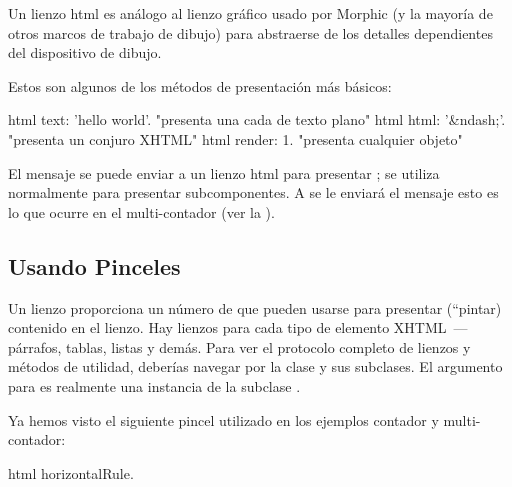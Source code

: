 \documentclass[a4paper,10pt,twoside]{book}
\begin{document}
Un lienzo html es análogo al lienzo gráfico usado por Morphic (y la mayoría de otros marcos de trabajo de dibujo) para abstraerse de los detalles dependientes del dispositivo de dibujo.
 
Estos son algunos de los métodos de presentación más básicos:
\begin{code}{}
html text: 'hello world'.  "presenta una cada de texto plano"
html html: '&ndash;'.     "presenta un conjuro XHTML"
html render: 1.              "presenta cualquier objeto"
\end{code}

El mensaje  se puede enviar a un lienzo html para presentar ; se utiliza normalmente para presentar subcomponentes. A  se le enviará el mensaje 
esto es lo que ocurre en el multi-contador (ver la ).

\subsection{Usando Pinceles}

Un lienzo proporciona un número de  que pueden usarse para presentar (\ie ``pintar) contenido en el lienzo.
Hay lienzos para cada tipo de elemento XHTML \,---\,párrafos, tablas, listas y demás.
Para ver el protocolo completo de lienzos y métodos de utilidad, deberías navegar por la clase  y sus subclases.
El argumento para  es realmente una instancia de la subclase .

Ya hemos visto el siguiente pincel utilizado en los ejemplos contador y multi-contador:
\begin{code}{}
html horizontalRule.
\end{code}
\end{document}
